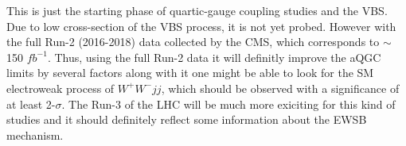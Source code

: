 This is just the starting phase of quartic-gauge coupling studies and the VBS. Due to low cross-section of the VBS process, it is not yet probed. However with the full Run-2 (2016-2018) data collected by the CMS, which corresponds to $\sim$150 $fb^{-1}$. Thus, using the full Run-2 data it will definitly improve the aQGC limits by several factors along with it one might be able to look for the SM electroweak process of $W^+W^-jj$, which should be observed with a significance of at least 2-$\sigma$. The Run-3 of the LHC will be much more exiciting for this kind of studies and it should definitely reflect some information about the EWSB mechanism.




